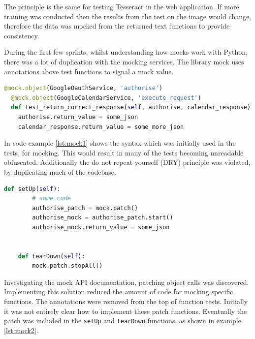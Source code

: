 The principle is the same for testing Tesseract in the web application. If more training was conducted then the results from the test on the image would change, therefore the data was mocked from the returned text functions to provide consistency.

During the first few sprints, whilst understanding how mocks work with Python, there was a lot of duplication with the mocking services. The library mock \cite{citeulike:14020599} uses annotations above test functions to signal a mock value.

\begin{lstlisting}[language=python, caption={An example of using mocks, following the annotation pattern}, label={lst:mock1}, breaklines, columns=fullflexible, keywordstyle=\color{blue}, basicstyle=\normalsize\ttfamily]
  @mock.object(GoogleOauthService, 'authorise')
  @mock.object(GoogleCalendarService, 'execute_request')
  def test_return_correct_response(self, authorise, calendar_response):
    authorise.return_value = some_json
    calendar_response.return_value = some_more_json
\end{lstlisting}

In code example \ref{lst:mock1} shows the syntax which was initially used in the tests, for mocking. This would result in many of the tests becoming unreadable obfuscated. Additionally the do not repeat yourself (DRY) principle was violated, by duplicating much of the codebase.

\begin{lstlisting}[language=python, label={lst:mock2}, breaklines, columns=fullflexible, keywordstyle=\color{blue}, label={Mocks using the patch and start. It stops in the dear downs}, basicstyle=\normalsize\ttfamily]
    def setUp(self):
        # some code
        authorise_patch = mock.patch()
        authorise_mock = authorise_patch.start()
        authorise_mock.return_value = some_json


    def tearDown(self):
        mock.patch.stopAll()
\end{lstlisting}
Investigating the mock API documentation, patching object calls was discovered. Implementing this solution reduced the amount of code for mocking specific functions. The annotations were removed from the top of function tests. Initially it was not entirely clear how to implement these patch functions. Eventually the patch was included in the \lstinline[basicstyle=\normalsize\ttfamily]{setUp} and \lstinline[basicstyle=\normalsize\ttfamily]{tearDown} functions, as shown in example \ref{lst:mock2}.



